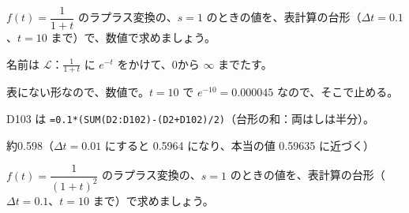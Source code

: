 \begin{reidai}
$f(t)=\dfrac{1}{1+t}$ のラプラス変換の、$s=1$ のときの値を、表計算の台形（$\Delta t=0.1$、$t=10$ まで）で、数値で求めましょう。\par
\kangaekata {}\par
{}\enspace 名前は $\mathcal L$：$\frac{1}{1+t}$ に $e^{-t}$ をかけて、0から $\infty$ までたす。\par
{}\enspace 表にない形なので、数値で。$t=10$ で $e^{-10}=0.000045$ なので、そこで止める。\par
\shiki\par\nobreak
\begin{bkcenter}
\end{bkcenter}
D103 は \texttt{=0.1*(SUM(D2:D102)-(D2+D102)/2)}（台形の和：両はしは半分）。\par

\kotae 約0.598（$\Delta t=0.01$ にすると 0.5964 になり、本当の値 0.59635 に近づく）
\end{reidai}

\begin{jibun}
$f(t)=\dfrac{1}{(1+t)^2}$ のラプラス変換の、$s=1$ のときの値を、表計算の台形（$\Delta t=0.1$、$t=10$ まで）で求めましょう。
\end{jibun}

